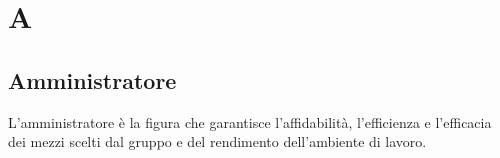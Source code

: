 \section{A}
	\subsection{Amministratore}  
		L'amministratore è la figura che garantisce l’affidabilità, l’efficienza e l’efficacia dei mezzi scelti dal gruppo e del rendimento dell’ambiente di lavoro.
		
\newpage